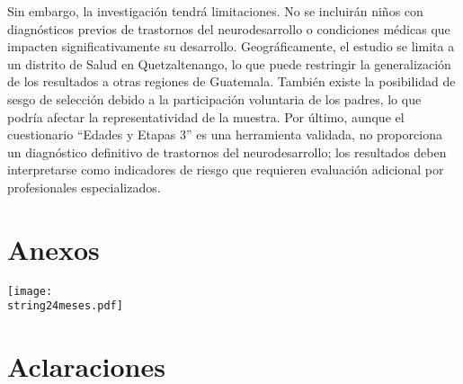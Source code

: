 \documentclass[11pt,letterpaper]{report}
\begin{document}
Sin embargo, la investigación tendrá limitaciones. No se incluirán niños con
diagnósticos previos de trastornos del neurodesarrollo o condiciones médicas
que impacten significativamente su desarrollo. Geográficamente, el estudio se
limita a un distrito de Salud en Quetzaltenango, lo que puede restringir la
generalización de los resultados a otras regiones de Guatemala. También existe
la posibilidad de sesgo de selección debido a la participación voluntaria de
los padres, lo que podría afectar la representatividad de la muestra. Por
último, aunque el cuestionario “Edades y Etapas 3” es una herramienta validada,
no proporciona un diagnóstico definitivo de trastornos del neurodesarrollo; los
resultados deben interpretarse como indicadores de riesgo que requieren
evaluación adicional por profesionales especializados.

\chapter{Anexos}
\texttt{[image: \\string24meses.pdf]}


\chapter*{Aclaraciones}

\printbibliography
\end{document}
